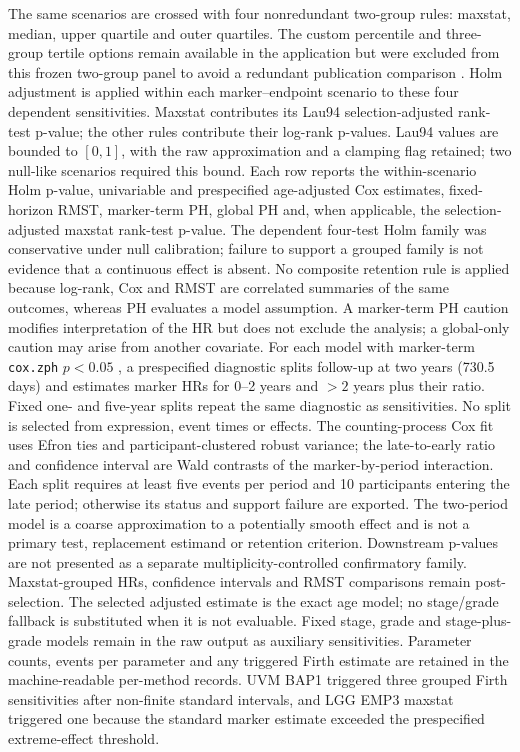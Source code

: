 \documentclass[12pt]{article}
\begin{document}
The same scenarios are crossed with four nonredundant two-group rules:
maxstat, median, upper quartile and outer quartiles. The custom
percentile and three-group tertile options remain available in the application
but were excluded from this frozen two-group panel to avoid a redundant
publication comparison \citep{altmanRoyston2006,cutpoints2025}. Holm adjustment
is applied within each
marker--endpoint scenario to these four dependent sensitivities. Maxstat
contributes its Lau94 selection-adjusted rank-test p-value; the other rules
contribute their log-rank p-values. Lau94 values are bounded to \([0,1]\), with
the raw approximation and a clamping flag retained; two null-like scenarios
required this bound. Each row reports the within-scenario Holm p-value,
univariable and prespecified age-adjusted Cox estimates, fixed-horizon RMST,
marker-term PH, global PH and, when
applicable, the selection-adjusted maxstat rank-test p-value. The dependent
four-test Holm family was conservative under null calibration; failure to
support a grouped family is not evidence that a continuous effect is absent.
No composite
retention rule is applied because log-rank, Cox and RMST are correlated
summaries of the same outcomes, whereas PH evaluates a model assumption. A
marker-term PH caution modifies interpretation of the HR but does not exclude
the analysis; a global-only caution may arise from another covariate. For each
model with marker-term \texttt{cox.zph} \(p<0.05\)
\citep{grambschTherneau1994}, a prespecified diagnostic splits follow-up at two
years (730.5 days) and estimates marker HRs for 0--2 years and \(>2\) years
plus their ratio. Fixed one- and five-year splits repeat the same diagnostic as
sensitivities. No split is selected from expression, event times or effects.
The counting-process Cox fit uses Efron ties and participant-clustered robust
variance; the late-to-early ratio and confidence interval are Wald contrasts
of the marker-by-period interaction. Each split requires at least five events
per period and 10 participants entering the late period; otherwise its status
and support failure are exported. The two-period model is a coarse
approximation to a potentially smooth effect and is not a primary test,
replacement estimand or retention criterion.
Downstream p-values are not presented as a separate multiplicity-controlled
confirmatory family. Maxstat-grouped HRs, confidence intervals and RMST
comparisons remain post-selection. The selected adjusted estimate is the exact
age model; no stage/grade fallback is substituted when it is not evaluable.
Fixed stage, grade and stage-plus-grade models remain in the raw output as
auxiliary sensitivities.
Parameter counts, events per parameter and any triggered Firth estimate are
retained in the machine-readable per-method records. UVM BAP1 triggered three
grouped Firth sensitivities after non-finite standard intervals, and LGG EMP3
maxstat triggered one because the standard marker estimate exceeded the
prespecified extreme-effect threshold.
\end{document}
